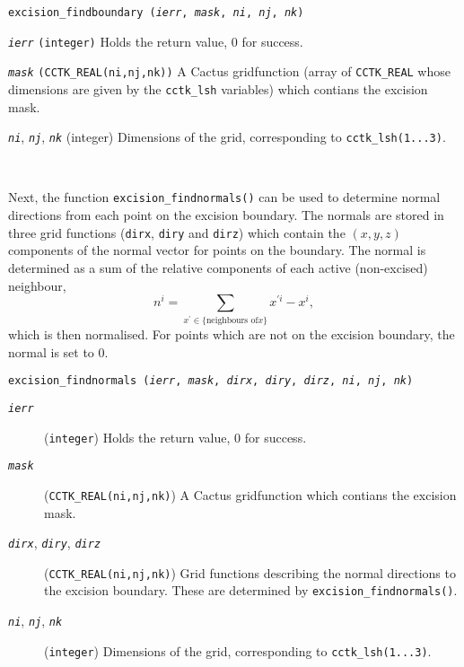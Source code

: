 \documentclass{article}
\begin{document}
\parbox{.9\linewidth}{
\texttt{excision\_findboundary (\emph{ierr}, \emph{mask}, \emph{ni},
  \emph{nj}, \emph{nk})}

\begin{description}
\item{\texttt{\emph{ierr}}} \texttt{(integer)}
  Holds the return value, 0 for success.
\item{\texttt{\emph{mask}}} \texttt{(CCTK\_REAL(ni,nj,nk))}
  A Cactus gridfunction (array of \texttt{CCTK\_REAL} whose
  dimensions are given by the \texttt{cctk\_lsh} variables)
  which contians the excision mask.
\item{\texttt{\emph{ni}}, \texttt{\emph{nj}}, \texttt{\emph{nk}}} (integer)
  Dimensions of the grid, corresponding to \texttt{cctk\_lsh(1...3)}.
\end{description}
}\\\vspace{\baselineskip}

Next, the function \texttt{excision\_findnormals()} can be used to
determine normal directions from each point on the excision boundary.
The normals are stored in three grid functions (\texttt{dirx},
\texttt{diry} and \texttt{dirz}) which contain the $(x,y,z)$
components of the normal vector for points on the boundary. The normal
is determined as a sum of the relative components of each active
(non-excised) neighbour,
\begin{equation}
n^i = \sum_{x^\prime\in\{\text{neighbours of} x\}} x^{\prime i} - x^i,
\end{equation}
which is then normalised. For points which are not on the excision
boundary, the normal is set to $0$.\\\vspace{\baselineskip}

\parbox{.9\linewidth}{
\texttt{excision\_findnormals (\emph{ierr}, \emph{mask}, \emph{dirx},
  \emph{diry}, \emph{dirz}, \emph{ni}, \emph{nj}, \emph{nk})}
\begin{description}
  \item[\texttt{\emph{ierr}}] (\texttt{integer})
    Holds the return value, 0 for success.
  \item[\texttt{\emph{mask}}] (\texttt{CCTK\_REAL(ni,nj,nk)})
    A Cactus gridfunction which contians the excision mask.
  \item[\texttt{\emph{dirx}}, \texttt{\emph{diry}},
    \texttt{\emph{dirz}}] (\texttt{CCTK\_REAL(ni,nj,nk)})
    Grid functions describing the normal directions to the excision
    boundary. These are determined by \texttt{excision\_findnormals()}.
  \item[\texttt{\emph{ni}}, \texttt{\emph{nj}}, \texttt{\emph{nk}}]
    (\texttt{integer}) Dimensions of the grid, corresponding to
    \texttt{cctk\_lsh(1...3)}.
\end{description}
}\\\vspace{\baselineskip}
\end{document}
